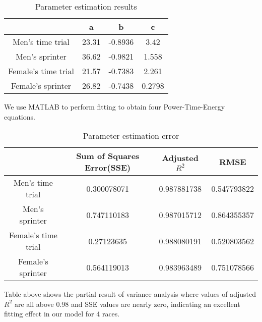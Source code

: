 \begin{table}[htbp]
  \centering
  \caption{Parameter estimation results}
    \begin{tabular}{cccc}
    \toprule
          & a     & b     & c \\
    \midrule
    Men's time trial & 23.31 & -0.8936 & 3.42 \\
    Men's sprinter & 36.62 & -0.9821 & 1.558 \\
    Female's time trial & 21.57 & -0.7383 & 2.261 \\
    Female's sprinter & 26.82 & -0.7438 & 0.2798 \\
    \bottomrule
    \end{tabular}%
  \label{tab:addlabel}%
\end{table}%
\par We use MATLAB to perform fitting to obtain four Power-Time-Energy equations.

\begin{table}[htbp]
	\centering
	\caption{Parameter estimation error}
	\begin{tabular}{cccc}
		\toprule
		& Sum of Squares Error(SSE)   & Adjusted $R^2$ & RMSE \\
		\midrule
		Men's time trial & 0.300078071 & 0.987881738 & 0.547793822 \\
		Men's sprinter & 0.747110183 & 0.987015712 & 0.864355357 \\
		Female's time trial & 0.27123635 & 0.988080191 & 0.520803562 \\
		Female's sprinter & 0.564119013 & 0.983963489 & 0.751078566 \\
		\bottomrule
	\end{tabular}%
	\label{tab:addlabel}%
\end{table}%
\par Table above shows the partial result of variance analysis where values of adjusted $R^2$ are all above 0.98 and SSE values are nearly zero, indicating an excellent fitting effect in our model for 4 races.